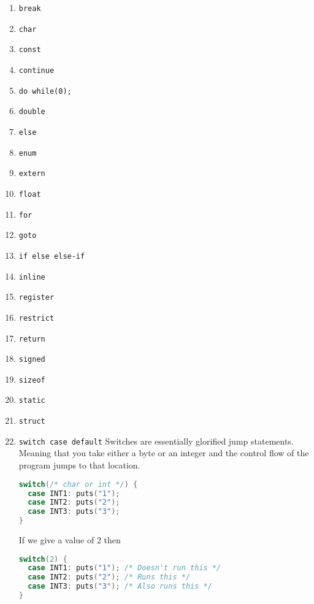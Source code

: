 \begin{enumerate}
\item \texttt{break}
\item \texttt{char}
\item \texttt{const}
\item \texttt{continue}
\item \texttt{do {} while(0);}
\item \texttt{double}
\item \texttt{else}
\item \texttt{enum}
\item \texttt{extern}
\item \texttt{float}
\item \texttt{for}
\item \texttt{goto}
\item \texttt{if else else-if}
\item \texttt{inline}
\item \texttt{register}
\item \texttt{restrict}
\item \texttt{return}
\item \texttt{signed}
\item \texttt{sizeof}
\item \texttt{static}
\item \texttt{struct}
\item \texttt{switch case default} Switches are essentially glorified jump statements. Meaning that you take either a byte or an integer and the control flow of the program jumps to that location.
\begin{lstlisting}[language=C]
switch(/* char or int */) {
  case INT1: puts("1");
  case INT2: puts("2");
  case INT3: puts("3");
}
\end{lstlisting}

If we give a value of 2 then

\begin{lstlisting}[language=C]
switch(2) {
  case INT1: puts("1"); /* Doesn't run this */
  case INT2: puts("2"); /* Runs this */
  case INT3: puts("3"); /* Also runs this */
}
\end{lstlisting}


\end{enumerate}
